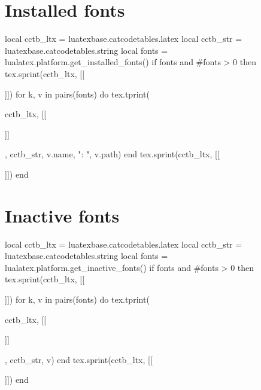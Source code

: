 \documentclass{article}
\begin{document}
\section{Installed fonts}

\begin{luacode*}
  local cctb_ltx = luatexbase.catcodetables.latex
  local cctb_str = luatexbase.catcodetables.string
  local fonts = lualatex.platform.get_installed_fonts()
  if fonts and #fonts > 0 then
     tex.sprint(cctb_ltx, [[\begin{itemize}]])
       for k, v in pairs(fonts) do
          tex.tprint({cctb_ltx, [[\item\relax]]}, {cctb_str, v.name, ": ", v.path})
       end
     tex.sprint(cctb_ltx, [[\end{itemize}]])
  end
\end{luacode*}

\section{Inactive fonts}

\begin{luacode*}
  local cctb_ltx = luatexbase.catcodetables.latex
  local cctb_str = luatexbase.catcodetables.string
  local fonts = lualatex.platform.get_inactive_fonts()
  if fonts and #fonts > 0 then
     tex.sprint(cctb_ltx, [[\begin{itemize}]])
       for k, v in pairs(fonts) do
          tex.tprint({cctb_ltx, [[\item\relax]]}, {cctb_str, v})
       end
    tex.sprint(cctb_ltx, [[\end{itemize}]])
  end
\end{luacode*}
\end{document}
